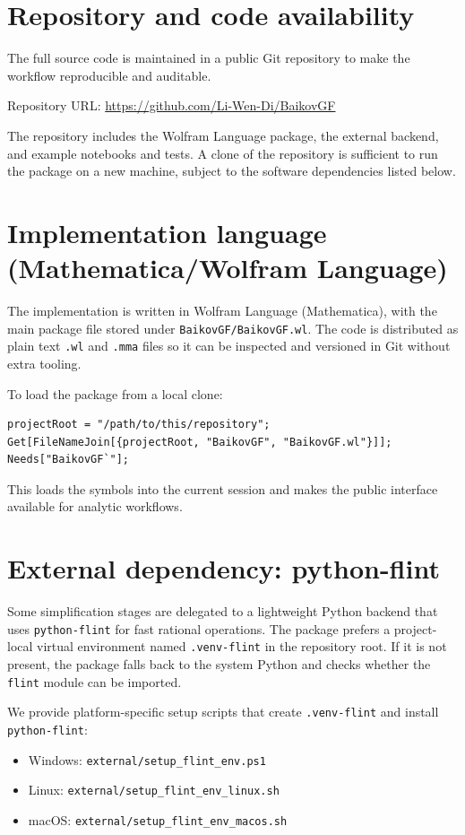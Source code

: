 \section*{Repository and code availability}
The full source code is maintained in a public Git repository to make the
workflow reproducible and auditable.

Repository URL: \url{https://github.com/Li-Wen-Di/BaikovGF}

The repository includes the Wolfram Language package, the external backend,
and example notebooks and tests. A clone of the repository is sufficient to
run the package on a new machine, subject to the software dependencies listed
below.

\section*{Implementation language (Mathematica/Wolfram Language)}
The implementation is written in Wolfram Language (Mathematica), with the main
package file stored under \texttt{BaikovGF/BaikovGF.wl}. The code is distributed
as plain text \texttt{.wl} and \texttt{.mma} files so it can be inspected and
versioned in Git without extra tooling.

To load the package from a local clone:
\begin{verbatim}
projectRoot = "/path/to/this/repository";
Get[FileNameJoin[{projectRoot, "BaikovGF", "BaikovGF.wl"}]];
Needs["BaikovGF`"];
\end{verbatim}

This loads the symbols into the current session and makes the public interface
available for analytic workflows.

\section*{External dependency: python-flint}
Some simplification stages are delegated to a lightweight Python backend that
uses \texttt{python-flint} for fast rational operations. The package prefers a
project-local virtual environment named \texttt{.venv-flint} in the repository
root. If it is not present, the package falls back to the system Python and
checks whether the \texttt{flint} module can be imported.

We provide platform-specific setup scripts that create \texttt{.venv-flint} and
install \texttt{python-flint}:
\begin{itemize}
  \item Windows: \texttt{external/setup\_flint\_env.ps1}
  \item Linux: \texttt{external/setup\_flint\_env\_linux.sh}
  \item macOS: \texttt{external/setup\_flint\_env\_macos.sh}
\end{itemize}

